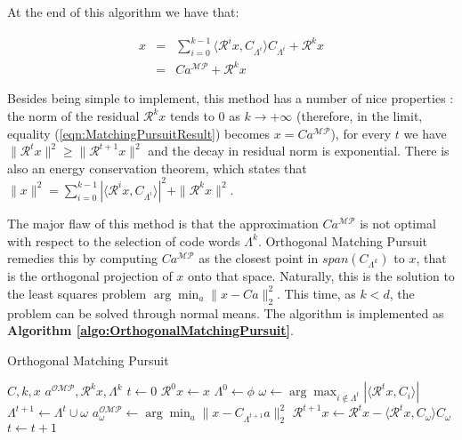 \documentclass[runningheads,a4paper]{llncs}
\begin{document}
At the end of this algorithm we have that:

\begin{eqnarray}
x & = & \sum_{i=0}^{k-1} \langle \mathcal{R}^ix , C_{\Lambda^i} \rangle C_{\Lambda^i} + \mathcal{R}^kx \\
\label{eqn:MatchingPursuitResult}
  & = & Ca^\mathcal{MP} + \mathcal{R}^kx
\end{eqnarray}

Besides being simple to implement, this method has a number of nice properties \cite{matchingpursuit2}: the norm of the residual $\mathcal{R}^kx$ tends to $0$ as $k \rightarrow +\infty$ (therefore, in the limit, equality (\ref{eqn:MatchingPursuitResult}) becomes $x = Ca^\mathcal{MP}$), for every $t$ we have $\|\mathcal{R}^tx\|^2 \geq \|\mathcal{R}^{t+1}x\|^2$ and the decay in residual norm is exponential. There is also an energy conservation theorem, which states that $\|x\|^2 = \sum_{i=0}^{k-1} \left| \langle \mathcal{R}^ix , C_{\Lambda^i} \rangle \right|^2 + \| \mathcal{R}^kx \|^2$.

The major flaw of this method is that the approximation $Ca^\mathcal{MP}$ is not optimal with respect to the selection of code words $\Lambda^k$. Orthogonal Matching Pursuit remedies this by computing $Ca^\mathcal{MP}$ as the closest point in $span(C_{\Lambda^k})$ to $x$, that is the orthogonal projection of $x$ onto that space. Naturally, this is the solution to the least squares problem $\arg \min_a \| x - Ca \|_2^2$. This time, as $k < d$, the problem can be solved through normal means. The algorithm is implemented as \textbf{Algorithm \ref{algo:OrthogonalMatchingPursuit}}.

\begin{algorithm}
\caption{Orthogonal Matching Pursuit}
\label{algo:OrthogonalMatchingPursuit}
\begin{algorithmic}
\Require $C,k,x$
\Ensure $a^\mathcal{OMP},\mathcal{R}^kx,\Lambda^k$
\State $t \gets 0$
\State $\mathcal{R}^0x \gets x$
\State $\Lambda^0 \gets \phi$
\State $\omega \gets \arg \max_{i \not\in \Lambda^t} \left| \langle \mathcal{R}^tx , C_i \rangle \right|$
\State $\Lambda^{t+1} \gets \Lambda^t \cup \omega$
\State $a_\omega^\mathcal{OMP} \gets \arg \min_a \| x - C_{\Lambda^{t+1}}a \|_2^2$
\State $\mathcal{R}^{t+1}x \gets \mathcal{R}^tx - \langle \mathcal{R}^tx , C_\omega \rangle C_\omega$
\State $t \gets t + 1$
\EndWhile
\end{algorithmic}
\end{algorithm}
\end{document}
